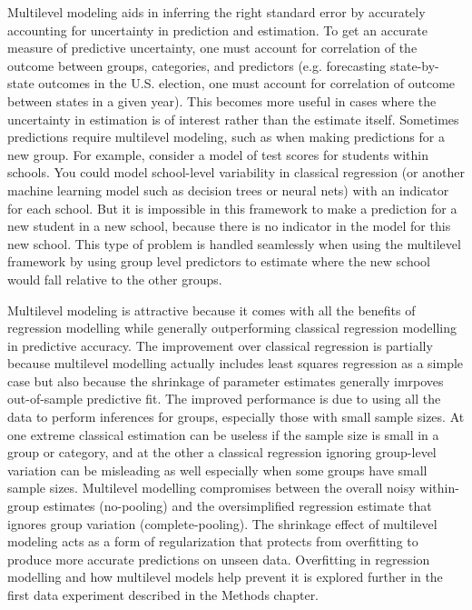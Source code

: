 Multilevel modeling aids in inferring the right standard error by accurately accounting for uncertainty in prediction and estimation. To get an accurate measure of predictive uncertainty, one must account for correlation of the outcome between groups, categories, and predictors (e.g. forecasting state-by-state outcomes in the U.S. election, one must account for correlation of outcome between states in a given year). This becomes more useful in cases where the uncertainty in estimation is of interest rather than the estimate itself. Sometimes predictions require multilevel modeling, such as when making predictions for a new group. For example, consider a model of test scores for students within schools. You could model school-level variability in classical regression (or another machine learning model such as decision trees or neural nets) with an indicator for each school. But it is impossible in this framework to make a prediction for a new student in a new school, because there is no indicator in the model for this new school. This type of problem is handled seamlessly when using the multilevel framework by using group level predictors to estimate where the new school would fall relative to the other groups.

Multilevel modeling is attractive because it comes with all the benefits of regression modelling while generally outperforming classical regression modelling in predictive accuracy. The improvement over classical regression is partially because multilevel modelling actually includes least squares regression as a simple case but also because the shrinkage of parameter estimates generally imrpoves out-of-sample predictive fit. The improved performance is due to using all the data to perform inferences for groups, especially those with small sample sizes. At one extreme classical estimation can be useless if the sample size is small in a group or category, and at the other a classical regression ignoring group-level variation can be misleading as well especially when some groups have small sample sizes. Multilevel modelling compromises between the overall noisy within-group estimates (no-pooling) and the oversimplified regression estimate that ignores group variation (complete-pooling). The shrinkage effect of multilevel modeling acts as a form of regularization that protects from overfitting to produce more accurate predictions on unseen data. Overfitting in regression modelling and how multilevel models help prevent it is explored further in the first data experiment described in the Methods chapter.

